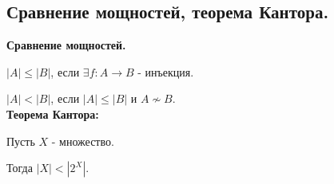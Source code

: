 \subsection{Сравнение мощностей, теорема Кантора.}
\textbf{Сравнение мощностей.}

$|A| \leq |B|$, если $\exists f : A \to B$ - инъекция.

$|A| < |B|$, если $|A| \leq |B|$ и $A \not \sim B$.\\

\textbf{Теорема Кантора:}

Пусть $X$ - множество.

Тогда $|X| < |2^X|$.
